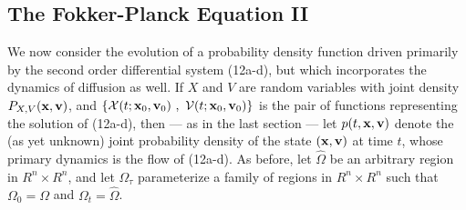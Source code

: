 \subsection{The Fokker-Planck Equation II}
We now consider the evolution of a probability density function 
driven primarily by the second order differential system (12a-d), 
but which incorporates the dynamics of diffusion as well. 
If $X$ and $V$ are random variables with joint density
$P_{X,V}({\bf x}, {\bf v})$, and
$\{{\cal X}(t; {\bf x}_0, {\bf v}_0)~,~{\cal V}(t; {\bf x}_0, {\bf v}_0)\}$
is the pair of functions representing the solution of (12a-d), then ---
as in the last section --- let $p(t, {\bf x}, {\bf v})$ denote the
(as yet unknown) joint probability density of the state
$({\bf x}, {\bf v})$ at time $t$, whose primary dynamics is the
flow of (12a-d).
As before, let $\widehat \Omega$ be an arbitrary region in $R^n \times R^n$, 
and let 
$\Omega_\tau$ parameterize a family 
of regions in $R^n \times R^n$ such that 
$\Omega_0 = \Omega$ and $\Omega_t = \widehat \Omega$.

